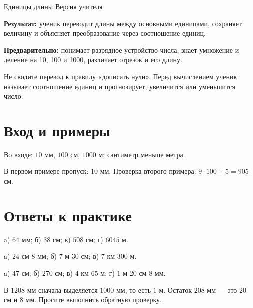 \worksheettitle
  {Единицы длины}
  { Версия учителя}

\begin{teacherbox}
  \textbf{Результат:} ученик переводит длины между основными единицами,
  сохраняет величину и объясняет преобразование через соотношение единиц.

  \textbf{Предварительно:} понимает разрядное устройство числа, знает
  умножение и деление на 10, 100 и 1000, различает отрезок и его длину.
\end{teacherbox}

\begin{teacherbox}
  Не сводите перевод к правилу «дописать нули». Перед вычислением ученик
  называет соотношение единиц и прогнозирует, увеличится или уменьшится число.
\end{teacherbox}

\section{Вход и примеры}

Во входе: $10$ мм, $100$ см, $1000$ м; сантиметр меньше метра.

\unitsladderfigure

В первом примере пропуск: $10$ мм. Проверка второго примера:
$9\cdot100+5=905$ см.

\section{Ответы к практике}

\begin{practicebox}
  a) $64$ мм; б) $38$ см; в) $508$ см; г) $6045$ м.
\end{practicebox}

\begin{practicebox}[2. Разложение]
  a) $24\text{ см }8\text{ мм}$; б) $7\text{ м }30\text{ см}$;
  в) $7\text{ км }300\text{ м}$.
\end{practicebox}

\begin{practicebox}[3. Самостоятельно]
  a) $47$ см; б) $270$ см; в) $4\text{ км }65\text{ м}$;
  г) $1\text{ м }20\text{ см }8\text{ мм}$.
\end{practicebox}

\begin{teacherbox}
  В $1208$ мм сначала выделяется $1000$ мм, то есть $1$ м. Остаток
  $208$ мм — это $20$ см и $8$ мм. Просите выполнить обратную проверку.
\end{teacherbox}

